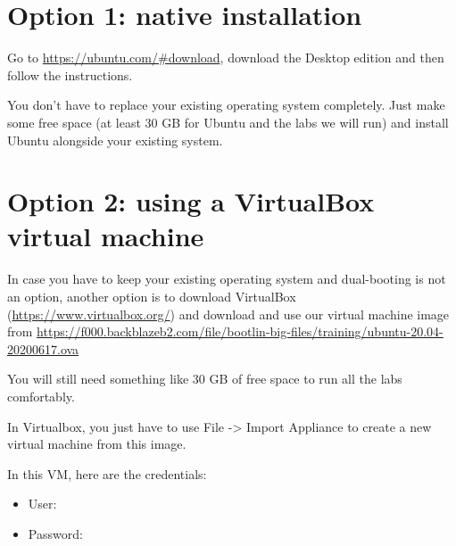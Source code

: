 
\section{Option 1: native installation}

Go to \url{https://ubuntu.com/#download}, download the Desktop edition
and then follow the instructions.

You don't have to replace your existing operating system completely.
Just make some free space (at least 30 GB for Ubuntu and the labs
we will run) and install Ubuntu alongside your existing system.

\section{Option 2: using a VirtualBox virtual machine}

In case you have to keep your existing operating system and
dual-booting is not an option, another option is to download VirtualBox
(\url{https://www.virtualbox.org/}) and download and use our virtual
machine image from
\url{https://f000.backblazeb2.com/file/bootlin-big-files/training/ubuntu-20.04-20200617.ova}

You will still need something like 30 GB of free space to run all the
labs comfortably.

In Virtualbox, you just have to use {\code File -> Import Appliance}
to create a new virtual machine from this image.

In this VM, here are the credentials:
\begin{itemize}
\item User: 
\item Password: 
\end{itemize}

